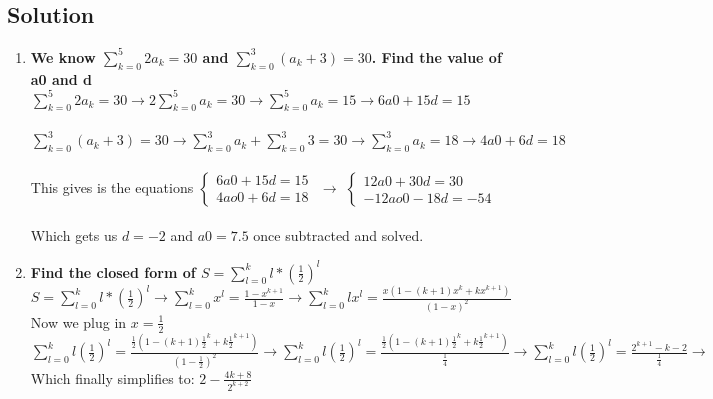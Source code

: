 \documentclass[11pt]{article}
\begin{document}
    \subsection*{Solution}
    \begin{enumerate}[label=(\alph*)]
        \item \textbf{We know \(\sum_{k=0}^{5}2a_{k}=30\) and \(\sum_{k=0}^{3}(a_{k}+3)=30\). Find the value of a0 and d} \\
        \(\sum_{k=0}^{5}2a_{k}=30 \rightarrow 2\sum_{k=0}^{5}a_{k}=30 \rightarrow \sum_{k=0}^{5}a_{k}=15 \rightarrow 6a0+15d =15\) \\ \\
        \(\sum_{k=0}^{3}(a_{k}+3)=30 \rightarrow \sum_{k=0}^{3}a_{k} + \sum_{k=0}^{3} 3=30 \rightarrow \sum_{k=0}^{3}a_{k} = 18 \rightarrow 4a0+6d=18\) \\ \\
        This gives is the equations
        \( \begin{cases}
        6a0+15d=15 \\
        4ao0+6d=18
    \end{cases}\) \(\rightarrow \)
    \( \begin{cases}
        12a0+30d=30 \\
        -12ao0-18d=-54
    \end{cases}\) \\ \\
    Which gets us \(d=-2\) and \(a0=7.5\) once subtracted and solved.

        
        \item \textbf{Find the closed form of \(S=\sum_{l=0}^{k}l*(\frac{1}{2})^l\)} 
        \(S=\sum_{l=0}^{k}l*(\frac{1}{2})^l \rightarrow \sum_{l=0}^{k}x^l=\frac{1-x^{k+1}}{1-x} \rightarrow \sum_{l=0}^{k}lx^l= \frac{x(1-(k+1)x^k+kx^{k+1})}{(1-x)^2}\) \\
        Now we plug in \(x=\frac{1}{2}\) \\
        \(\sum_{l=0}^{k}l(\frac{1}{2})^l= \frac{\frac{1}{2}(1-(k+1)\frac{1}{2}^k+k\frac{1}{2}^{k+1})}{(1-\frac{1}{2})^2} 
        \rightarrow
        \sum_{l=0}^{k}l(\frac{1}{2})^l= \frac{\frac{1}{2}(1-(k+1)\frac{1}{2}^k+k\frac{1}{2}^{k+1})}{\frac{1}{4}}
        \rightarrow
        \sum_{l=0}^{k}l(\frac{1}{2})^l= \frac{2^{k+1}-k-2}{\frac{1}{4}}
        \rightarrow \) \\

        Which finally simplifies to: 
        \(
        2-\frac{4k+8}{2^{k+2}}
        \)

        
    \end{enumerate}
\end{document}
